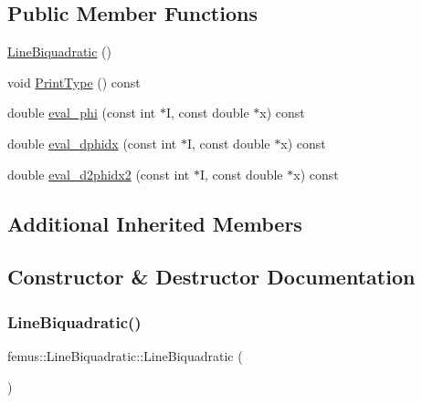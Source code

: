 \subsection*{Public Member Functions}
\begin{DoxyCompactItemize}
\item 
\mbox{\hyperlink{classfemus_1_1_line_biquadratic_a7735574bc9772c8768d497ddc4acebc4}{Line\+Biquadratic}} ()
\item 
void \mbox{\hyperlink{classfemus_1_1_line_biquadratic_a54463fff187f1fb64a4252c16bae0afe}{Print\+Type}} () const
\item 
double \mbox{\hyperlink{classfemus_1_1_line_biquadratic_aaea2d87519c0e65678685ab1c64e65f9}{eval\+\_\+phi}} (const int $\ast$I, const double $\ast$x) const
\item 
double \mbox{\hyperlink{classfemus_1_1_line_biquadratic_a05d4702daa38615c5cb8ebd0045d61a4}{eval\+\_\+dphidx}} (const int $\ast$I, const double $\ast$x) const
\item 
double \mbox{\hyperlink{classfemus_1_1_line_biquadratic_ab6a7b188104b706b792227aaab0ebf2a}{eval\+\_\+d2phidx2}} (const int $\ast$I, const double $\ast$x) const
\end{DoxyCompactItemize}
\subsection*{Additional Inherited Members}


\subsection{Constructor \& Destructor Documentation}
\mbox{\label{classfemus_1_1_line_biquadratic_a7735574bc9772c8768d497ddc4acebc4}} 
\subsubsection{\texorpdfstring{Line\+Biquadratic()}{LineBiquadratic()}}
{\footnotesize\ttfamily femus\+::\+Line\+Biquadratic\+::\+Line\+Biquadratic (\begin{DoxyParamCaption}{ }\end{DoxyParamCaption})\hspace{0.3cm}{\ttfamily [inline]}}



